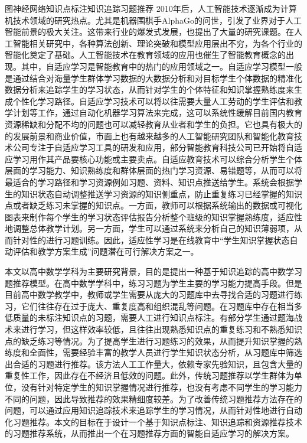 
\begin{abstractC}{图神经网络}{知识点标注}{知识追踪}{习题推荐}{}
    2010年后，人工智能技术逐渐成为计算机技术领域的研究热点。尤其是机器围棋手AlphaGo的问世，引发了业界对于人工智能前景的极大关注。这带来行业的爆发式发展，也提出了大量的研究课题。在人工智能相关研究中，各种算法创新、理论突破和模型应用层出不穷，为各个行业的智能化奠定了基础。人工智能技术在教育领域的应用也催生了智能教育概念的出现。其中，自适应学习是智能教育中的热门的应用领域之一\cite{ma2017adalearn}。自适应学习模型一般是通过结合对海量学生群体学习数据的大数据分析和对目标学生个体数据的精准化数据分析来追踪学生的学习状态，从而针对学生的个体特征和知识掌握熟练度来生成个性化学习路径\cite{soltani2019adaptive}。自适应学习技术可以将以往需要大量人工劳动的学生评估和教学计划等工作，通过自动化机器学习算法来完成，这可以系统性缓解目前国内教育资源稀缺和分配不均的问题也可以减轻教育从业者和学生的负担。它也具有极大的的发展前景和商业价值，市面上也有越来越多的人工智能研究团队和智能化教育技术公司专注于自适应学习工具的研发和应用，部分智能教育科技公司已开始将自适应学习用作其产品要核心功能或主要卖点。自适应教育技术可以综合分析学生个体层面的学习能力、知识熟练度和群体层面的热门学习资源、易错题等，从而可以将最适合的学习路径和学习资源例如习题、资料、知识点推送给学生。系统会根据学生的知识状态自动调整推送学习资源的知识侧重点，防止重复练习已经掌握的知识点或者缺乏练习未掌握的知识点。一方面，教师可以根据系统输出的数据或可视化图表来制作每个学生的学习状态评估报告分析整个班级的知识掌握熟练度，适应性地调整总体教学计划。另一方面，学生可以通过系统来分析自己的知识薄弱项，从而针对性的进行习题训练。因此，适应性学习是在线教育中``学生知识掌握状态自动评估和教学方案生成''问题潜在可行解决方案之一。

    本文以高中数学学科为主要研究背景，目的是提出一种基于知识追踪的高中数学习题推荐模型。在高中数学学科中，练习习题为学生主要的学习能力提高手段。但是目前高中数学教学中，教师或学生需要从庞大的习题库中去寻找合适的习题进行练习，它们往往存在过于庞大、重复度高和组织混乱等问题。在习题库中存在相当多低质量的未标注知识点的习题，需要人工进行知识点标注。有部分学生通过题海战术来进行学习，但这样效率较低，且往往出现熟悉知识点的重复练习和不熟悉知识点的缺乏练习等情况。为了提高学生进行习题练习的效果，从而提升知识掌握的熟练度和全面性，需要经验丰富的教学人员进行学生知识状态分析，从习题库中筛选出合适的习题进行推荐。该方法人工工作量大，依赖专家先验知识，且包含大量的重复性工作，因此存在不经济且低效的问题。此外，传统习题推荐以学生群体为单位，没有针对特定学生的知识掌握情况进行推荐，也没有考虑不同学生的学习能力不同的问题，因此导致推荐的效果精细度较差。为了改善传统习题推荐方法存在的问题，可以通过应用知识追踪技术来追踪学生的学习情况，从而针对性地进行自动化习题推荐。本文的目标在于设计一个基于知识点标注、知识追踪和资源推荐技术的习题推荐系统，从而推出一个在习题推荐方面的智能自适应学习的解决方案。


\end{abstractC}
